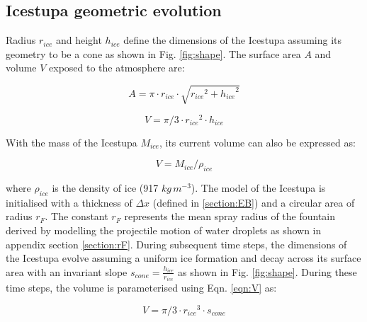 \documentclass[utf8]{frontiersSCNS} %
\begin{document}
\subsection{Icestupa geometric evolution}

Radius $r_{ice}$ and height $h_{ice}$ define the dimensions of the Icestupa assuming its geometry to be a cone as shown
in Fig. \ref{fig:shape}. The surface area $A$ and volume $V$ exposed to the atmosphere are:

\begin{equation} A = \pi \cdot r_{ice} \cdot \sqrt{{r_{ice}}^2 + {h_{ice}}^ 2} \label{eqn:A} \end{equation}

\begin{equation} V = \pi/3 \cdot {r_{ice}}^2 \cdot h_{ice} \label{eqn:V} \end{equation}

With the mass of the Icestupa $M_{ice}$, its current volume can also be expressed as:

\begin{equation} V = M_{ice} / \rho_{ice} \label{eqn:V1} \end{equation}

where $\rho_{ice}$ is the density of ice (917 $kg\, m^{-3}$). The model of the Icestupa is initialised with a thickness
of $\Delta x$ (defined in \ref{section:EB}) and a circular area of radius $r_F$. The constant $r_F$ represents the mean
spray radius of the fountain derived by modelling the projectile motion of water droplets as shown in appendix section
\ref{section:rF}. During subsequent time steps, the dimensions of the Icestupa evolve assuming a uniform ice formation
and decay across its surface area with an invariant slope $s_{cone} = \frac{h_{ice}}{r_{ice}}$ as shown in Fig.
\ref{fig:shape}. During these time steps, the volume is parameterised using Eqn. \ref{eqn:V} as:

\begin{equation} V = \pi/3 \cdot {r_{ice}}^3 \cdot s_{cone} \label{eqn:V2} \end{equation}
\end{document}

